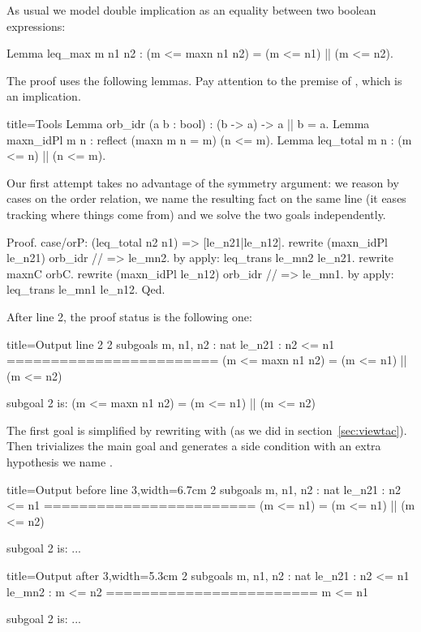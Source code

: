 As usual we model double implication as an equality between two
boolean expressions:

\begin{coq}{}{}
Lemma leq_max m n1 n2 : (m <= maxn n1 n2) = (m <= n1) || (m <= n2).
\end{coq}

The proof uses the following lemmas.  Pay attention to the premise of
, which is an implication.

\begin{coq}{}{title=Tools}
Lemma orb_idr (a b : bool) : (b -> a) -> a || b = a.
Lemma maxn_idPl {m n} : reflect (maxn m n = m) (n <= m).
Lemma leq_total m n : (m <= n) || (n <= m).
\end{coq}

Our first attempt takes no advantage of the symmetry argument:
we reason by cases on the order relation,
we name the resulting fact on the same line
(it eases tracking where things come from) and we solve the two
goals independently.

\begin{coq}{}{}
Proof.
case/orP: (leq_total n2 n1) => [le_n21|le_n12].
  rewrite (maxn_idPl le_n21) orb_idr // => le_mn2.
  by apply: leq_trans le_mn2 le_n21.
rewrite maxnC orbC.
rewrite (maxn_idPl le_n12) orb_idr // => le_mn1.
by apply: leq_trans le_mn1 le_n12.
Qed.
\end{coq}

After line 2, the proof status is the following one:

\begin{coqout}{}{title=Output line 2}
2 subgoals
m, n1, n2 : nat
le_n21 : n2 <= n1
========================
(m <= maxn n1 n2) = (m <= n1) || (m <= n2)

subgoal 2 is:
(m <= maxn n1 n2) = (m <= n1) || (m <= n2)
\end{coqout}

The first goal is simplified by
rewriting with  (as we did in section~\ref{sec:viewtac}).
Then  trivializes the main goal and generates a side condition with
an extra hypothesis we name .

\begin{coqout}{}{title=Output before line 3,width=6.7cm}
2 subgoals
m, n1, n2 : nat
le_n21 : n2 <= n1
========================
(m <= n1) = (m <= n1) || (m <= n2)

subgoal 2 is: ...
\end{coqout}
\begin{coqout}{}{title=Output after 3,width=5.3cm}
2 subgoals
m, n1, n2 : nat
le_n21 : n2 <= n1
le_mn2 : m <= n2
========================
m <= n1

subgoal 2 is: ...
\end{coqout}

